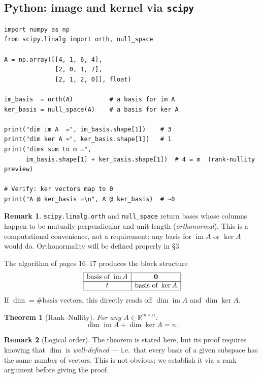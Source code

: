\documentclass[11pt]{article}
\theoremstyle{definition}
\newtheorem{remark}{Remark}[section]
\theoremstyle{plain}
\newtheorem{theorem}{Theorem}[section]
\begin{document}
\subsection{Python: image and kernel via \texttt{scipy}}
\begin{lstlisting}
import numpy as np
from scipy.linalg import orth, null_space

A = np.array([[4, 1, 6, 4],
              [2, 0, 1, 7],
              [2, 1, 2, 0]], float)

im_basis  = orth(A)          # a basis for im A
ker_basis = null_space(A)    # a basis for ker A

print("dim im A  =", im_basis.shape[1])    # 3
print("dim ker A =", ker_basis.shape[1])   # 1
print("dims sum to m =",
      im_basis.shape[1] + ker_basis.shape[1])  # 4 = m  (rank-nullity preview)

# Verify: ker vectors map to 0
print("A @ ker_basis =\n", A @ ker_basis)  # ~0
\end{lstlisting}
\begin{remark}
  \texttt{scipy.linalg.orth} and \texttt{null\_space} return bases whose
  columns happen to be mutually perpendicular and unit-length
  (\emph{orthonormal}).  This is a computational convenience, not a
  requirement: any basis for $\operatorname{im}A$ or $\ker A$ would do.
  Orthonormality will be defined properly in \S3.
\end{remark}


\noindent
The algorithm of pages 16--17 produces the block structure
\[
  \begin{array}{|c|c|}
    \hline
    \text{basis of }\operatorname{im}A & \mathbf{0} \\
    \hline
    t & \text{basis of }\ker A \\
    \hline
  \end{array}
\]
If $\dim = \#\text{basis vectors}$, this directly reads off
$\dim\operatorname{im}A$ and $\dim\ker A$.

\begin{theorem}[Rank--Nullity]\label{thm:ranknullity}
  For any $A \in \mathbb{R}^{m \times n}$:
  \[
    \dim\operatorname{im}A + \dim\ker A = n.
  \]
\end{theorem}

\begin{remark}[Logical order]
  The theorem is stated here, but its proof requires knowing that $\dim$ is
  \emph{well-defined} — i.e.\ that every basis of a given subspace has the
  same number of vectors.  This is not obvious; we establish it via a rank
  argument before giving the proof.
\end{remark}
\end{document}
